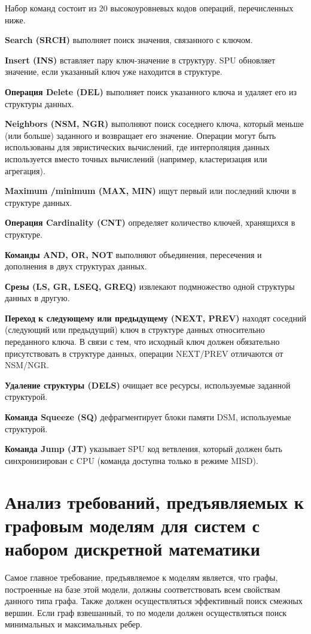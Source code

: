 Набор команд состоит из 20 высокоуровневых кодов операций, перечисленных ниже.
\begin{DoxyItemize}
\item {\bfseries Search (S\+R\+CH)} выполняет поиск значения, связанного с ключом.
\item {\bfseries Insert (I\+NS)} вставляет пару ключ-\/значение в структуру. S\+PU обновляет значение, если указанный ключ уже находится в структуре.
\item {\bfseries Операция Delete (D\+EL)} выполняет поиск указанного ключа и удаляет его из структуры данных.
\item {\bfseries Neighbors (N\+SM, N\+GR)} выполняют поиск соседнего ключа, который меньше (или больше) заданного и возвращает его значение. Операции могут быть использованы для эвристических вычислений, где интерполяция данных используется вместо точных вычислений (например, кластеризация или агрегация).
\item {\bfseries Maximum /minimum (M\+AX, M\+IN)} ищут первый или последний ключи в структуре данных.
\item {\bfseries Операция Cardinality (C\+NT)} определяет количество ключей, хранящихся в структуре.
\item {\bfseries Команды A\+ND, OR, N\+OT} выполняют объединения, пересечения и дополнения в двух структурах данных.
\item {\bfseries Срезы (LS, GR, L\+S\+EQ, G\+R\+EQ)} извлекают подмножество одной структуры данных в другую.
\item {\bfseries Переход к следующему или предыдущему (N\+E\+XT, P\+R\+EV)} находят соседний (следующий или предыдущий) ключ в структуре данных относительно переданного ключа. В связи с тем, что исходный ключ должен обязательно присутствовать в структуре данных, операции N\+E\+X\+T/\+P\+R\+EV отличаются от N\+S\+M/\+N\+GR.
\item {\bfseries Удаление структуры (D\+E\+LS)} очищает все ресурсы, используемые заданной структурой.
\item {\bfseries Команда Squeeze (SQ)} дефрагментирует блоки памяти D\+SM, используемые структурой.
\item {\bfseries Команда Jump (JT)} указывает S\+PU код ветвления, который должен быть синхронизирован с C\+PU (команда доступна только в режиме M\+I\+SD).
\end{DoxyItemize}\hypertarget{md_docs__xD0_x93_xD1_x80_xD0_xB0_xD1_x84_xD0_xBE_xD0_xB2_xD1_x8B_xD0_xB5__xD0_xBC_xD0_xBE_xD0_xB4_xD0_xB5_xD0_xBB_xD0_xB8_autotoc_md2}{}\section{Анализ требований, предъявляемых к графовым моделям для систем с набором дискретной математики}\label{md_docs__xD0_x93_xD1_x80_xD0_xB0_xD1_x84_xD0_xBE_xD0_xB2_xD1_x8B_xD0_xB5__xD0_xBC_xD0_xBE_xD0_xB4_xD0_xB5_xD0_xBB_xD0_xB8_autotoc_md2}
Самое главное требование, предъявляемое к моделям является, что графы, построенные на базе этой модели, должны соответствовать всем свойствам данного типа графа. Также должен осуществляться эффективный поиск смежных вершин. Если граф взвешанный, то по модели должен осуществляться поиск минимальных и максимальных ребер.

